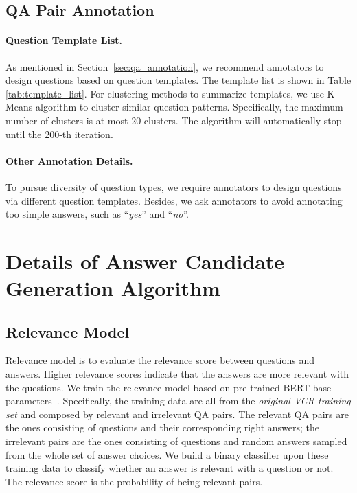 \documentclass[11pt]{article}
\begin{document}
\subsection{QA Pair Annotation}
\label{appendix:qa_pair_annotation}
\paragraph{Question Template List.} As mentioned in Section~\ref{sec:qa_annotation}, we recommend annotators to design questions based on question templates. The template list is shown in Table \ref{tab:template_list}. 
For clustering methods to summarize templates, we use K-Means algorithm to cluster similar question patterns. Specifically, the maximum number of clusters is at most 20 clusters. The algorithm will automatically stop until the 200-th iteration. 

\paragraph{Other Annotation Details.} To pursue diversity of question types, we require annotators to design questions via different question templates. 
Besides, we ask annotators to avoid annotating too simple answers, such as ``\textit{yes}'' and ``\textit{no}''.

\section{Details of Answer Candidate Generation Algorithm}
\subsection{Relevance Model}
\label{appendix:relevance}
Relevance model is to evaluate the relevance score between questions and answers. Higher relevance scores indicate that the answers are more relevant with the questions. We train the relevance model based on pre-trained BERT-base parameters~\cite{wolf-etal-2020-transformers}. Specifically, the training data are all from the \emph{original VCR training set} and composed by relevant and irrelevant QA pairs. The relevant QA pairs are the ones consisting of questions and their corresponding right answers; the irrelevant pairs are the ones consisting of questions and random answers sampled from the whole set of answer choices. We build a binary classifier upon these training data to classify whether an answer is relevant with a question or not. The relevance score is the probability of being relevant pairs.
\end{document}
